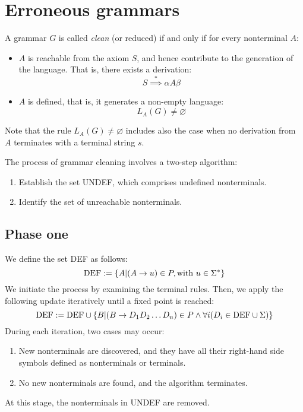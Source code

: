 \section{Erroneous grammars}

\begin{definition}
    A grammar $G$ is called \emph{clean} (or reduced) if and only if for every nonterminal $A$: 
    \begin{itemize}
        \item $A$ is reachable from the axiom $S$, and hence contribute to the generation of the language.
            That is, there exists a derivation: 
            \[S \overset{*}{\implies} \alpha A \beta\]
        \item $A$ is defined, that is, it generates a non-empty language: 
            \[L_A(G) \neq \varnothing\]
    \end{itemize}
\end{definition}
Note that the rule $L_A(G) \neq \varnothing$ includes also the case when no derivation from $A$ terminates with a terminal string $s$.

The process of grammar cleaning involves a two-step algorithm:
\begin{enumerate}
    \item Establish the set UNDEF, which comprises undefined nonterminals.
    \item Identify the set of unreachable nonterminals.
\end{enumerate}

\subsection*{Phase one}
We define the set DEF as follows:
\[\textnormal{DEF}:=\{A|( A \rightarrow u ) \in P,\textnormal{with } u \in \Sigma^{*}\}\]
We initiate the process by examining the terminal rules. 
Then, we apply the following update iteratively until a fixed point is reached:
\[\textnormal{DEF}:=\textnormal{DEF} \cup \{B|( B \rightarrow D_1D_2\dots D_n)\in P \land \forall i(D_i \in\textnormal{DEF} \cup \Sigma)\}\]
During each iteration, two cases may occur:
\begin{enumerate}
    \item New nonterminals are discovered, and they have all their right-hand side symbols defined as nonterminals or terminals.
    \item No new nonterminals are found, and the algorithm terminates.
\end{enumerate}
At this stage, the nonterminals in UNDEF are removed.

